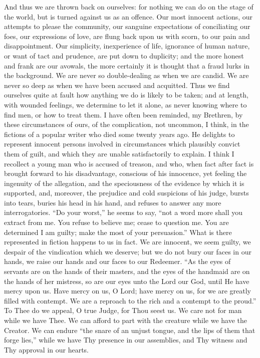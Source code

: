 And thus we are thrown back on ourselves: for nothing
we can do on the stage of the world, but is turned
against us as an offence. Our most innocent actions, our
attempts to please the community, our sanguine
expectations of conciliating our foes, our expressions of
love, are flung back upon us with scorn, to our pain and
disappointment. Our simplicity, inexperience of life,
ignorance of human nature, or want of tact and prudence,
are put down to duplicity; and the more honest and frank
are our avowals, the more certainly it is thought that a
fraud lurks in the background. We are never so
double-dealing as when we are candid. We are never so
deep as when we have been accused and acquitted. Thus we
find ourselves quite at fault how anything we do is
likely to be taken; and at length, with wounded feelings,
we determine to let it alone, as never knowing where to
find men, or how to treat them. I have often been
reminded, my Brethren, by these circumstances of ours, of
the complication, not uncommon, I think, in the fictions
of a popular writer who died some twenty years ago. He
delights to represent innocent persons involved in
circumstances which plausibly convict them of guilt, and
which they are unable satisfactorily to explain. I think
I recollect a young man who is accused of treason, and
who, when fact after fact is brought forward to his
disadvantage, conscious of his innocence, yet feeling the
ingenuity of the allegation, and the speciousness of the
evidence by which it is supported, and, moreover, the
prejudice and cold suspicions of his judge, bursts into
tears, buries his head in his hand, and refuses to answer
any more interrogatories. ``Do your worst,'' he
seems to say, ``not a word more shall you extract
from me. You refuse to believe me; cease to question me.
You are determined I am guilty; make the most of your
persuasion.'' What is there represented in fiction
happens to us in fact. We are innocent, we seem guilty,
we despair of the vindication which we deserve; but we do
not bury our faces in our hands, we raise our hands and
our faces to our Redeemer. ``As the eyes of servants
are on the hands of their masters, and the eyes of the
handmaid are on the hands of her mistress, so are our
eyes unto the Lord our God, until He have mercy upon us.
Have mercy on us, O Lord; have mercy on us, for we are
greatly filled with contempt. We are a reproach to the
rich and a contempt to the proud.'' To Thee do we
appeal, O true Judge, for Thou seest us. We care not for
man while we have Thee. We can afford to part with the
creature while we have the Creator. We can endure
``the snare of an unjust tongue, and the lips of them
that forge lies,'' while we have Thy presence in our
assemblies, and Thy witness and Thy approval in our
hearts.

